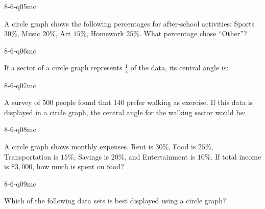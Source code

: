 \begin{practiceQuestion}{8-6-q05}{mc}
\begin{questionText}
A circle graph shows the following percentages for after-school activities: Sports $30\%$, Music $20\%$, Art $15\%$, Homework $25\%$. What percentage chose ``Other''?
\end{questionText}
\end{practiceQuestion}

\begin{practiceQuestion}{8-6-q06}{mc}
\begin{questionText}
If a sector of a circle graph represents $\frac{1}{5}$ of the data, its central angle is:
\end{questionText}
\end{practiceQuestion}

\begin{practiceQuestion}{8-6-q07}{mc}
\begin{questionText}
A survey of $500$ people found that $140$ prefer walking as exercise. If this data is displayed in a circle graph, the central angle for the walking sector would be:
\end{questionText}
\end{practiceQuestion}

\begin{practiceQuestion}{8-6-q08}{mc}
\begin{questionText}
A circle graph shows monthly expenses. Rent is $30\%$, Food is $25\%$, Transportation is $15\%$, Savings is $20\%$, and Entertainment is $10\%$. If total income is $\$3{,}000$, how much is spent on food?
\end{questionText}
\end{practiceQuestion}

\begin{practiceQuestion}{8-6-q09}{mc}
\begin{questionText}
Which of the following data sets is best displayed using a circle graph?
\end{questionText}
\end{practiceQuestion}

